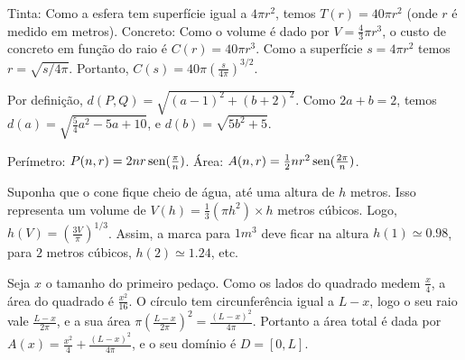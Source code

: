 \begin{Solution}{2.13}
Tinta: Como a esfera tem superfície igual a $4\pi r^2$, temos $T(r)=40\pi r^2$
(onde $r$ é medido em metros).
Concreto: Como o volume é dado por $V=\tfrac43\pi r^3$, o custo de concreto em
função do raio é $C(r)=40\pi r^3$. Como a superfície $s=4\pi r^2$ temos
$r=\sqrt{s/4\pi}$. Portanto,
$C(s)=40\pi(\tfrac{s}{4\pi})^{3/2}$.
\end{Solution}
\begin{Solution}{2.14}
 Por definição, $d(P,Q)=\sqrt{(a-1)^2+(b+2)^2}$.
Como $2a+b=2$, temos $d(a)=\sqrt{\tfrac54a^2-5a+10}$, e $d(b)=\sqrt{5b^2+5}$.
\end{Solution}
\begin{Solution}{2.15}
Perímetro: $P(n,r)=2nr\operatorname{sen} (\tfrac{\pi}{n})$.
Área: $A(n,r)=\tfrac12 nr^2\operatorname{sen}(\tfrac{2\pi}{n})$.
\end{Solution}
\begin{Solution}{2.16}
Suponha que o cone fique cheio de água, até uma altura de $h$ metros. Isso representa um
volume de
$V(h)=\tfrac13 (\pi h^2)\times h$ metros cúbicos. Logo, $h(V)=(\tfrac{3 V}{\pi})^{1/3}$.
Assim, a marca para $1m^3$ deve ficar na altura $h(1)\simeq 0.98$, para $2$ metros
cúbicos, $h(2)\simeq 1.24$, etc.
\begin{center}
\begin{bmlimage}\end{bmlimage}
\end{center}

\end{Solution}
\begin{Solution}{2.17}
Seja $x$ o tamanho do primeiro pedaço. Como os lados do quadrado medem
$\tfrac{x}{4}$, a área do quadrado é $\tfrac{x^2}{16}$. O círculo tem
circunferência igual a $L-x$, logo o seu raio vale $\tfrac{L-x}{2\pi}$, e a sua
área
$\pi(\tfrac{L-x}{2\pi})^2=\tfrac{(L-x)^2}{4\pi}$. Portanto a área total é dada por
$A(x)=\tfrac{x^2}{4}+\tfrac{(L-x)^2}{4\pi}$, e o seu domínio é $D=[0,L]$.
\end{Solution}
